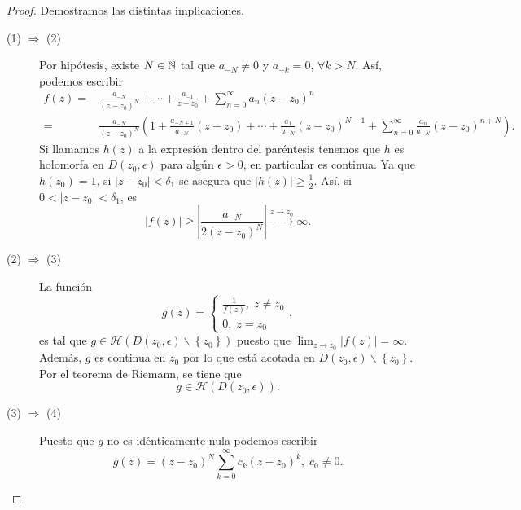 \begin{proof}
Demostramos las distintas implicaciones.
\begin{description}
\item[(1) $\displaystyle \Rightarrow $ (2)] Por hipótesis, existe $\displaystyle N \in \mathbb{N} $ tal que $\displaystyle a_{-N}\neq 0 $ y $\displaystyle a_{-k}=0 $, $\displaystyle \forall k > N $. Así, podemos escribir
	\[
	\begin{split}
		f\left(z\right)= & \frac{a_{-N}}{\left(z-z_{0}\right)^{N}}+ \cdots + \frac{a_{-1}}{z-z_{0}} + \sum^{\infty}_{n=0}a_{n}\left(z-z_{0}\right)^{n}\\
		= & \frac{a_{-N}}{\left(z-z_{0}\right)^{N}}\left(1 + \frac{a_{-N+1}}{a_{-N}}\left(z-z_{0}\right) + \cdots + \frac{a_{1}}{a_{-N}}\left(z-z_{0}\right)^{N-1}+\sum^{\infty}_{n = 0}\frac{a_{n}}{a_{-N}}\left(z-z_{0}\right)^{n + N}\right) .
	\end{split}
	\]
Si llamamos $\displaystyle h\left(z\right) $ a la expresión dentro del paréntesis tenemos que $\displaystyle h $ es holomorfa en $\displaystyle D\left(z_{0}, \epsilon \right) $ para algún $\displaystyle \epsilon > 0 $, en particular es continua. Ya que $\displaystyle h\left(z_{0}\right)=1 $, si $\displaystyle \left|z-z_{0}\right|< \delta_{1} $ se asegura que $\displaystyle \left|h\left(z\right)\right|\geq \frac{1}{2} $. 
Así, si $\displaystyle 0 < \left|z-z_{0}\right|<\delta_{1} $, es 
\[ \left|f\left(z\right)\right|\geq \left|\frac{a_{-N}}{2\left(z-z_{0}\right)^{N}}\right|\xrightarrow{z \to z_{0}}\infty .\]
\item[(2) $\displaystyle \Rightarrow $ (3)] La función 
	\[g\left(z\right)=
	\begin{cases}
	\frac{1}{f\left(z\right)}, \; z \neq z_{0} \\
	0, \; z = z_{0}
	\end{cases}
	,\]
	es tal que $\displaystyle g \in \mathcal{H}\left(D\left(z_{0}, \epsilon \right)\backslash \left\{ z_{0}\right\} \right) $ puesto que $\displaystyle \lim_{z \to z_{0}} \left|f\left(z\right)\right|=\infty  $. Además, $\displaystyle g $ es continua en $\displaystyle z_{0} $ por lo que está acotada en $\displaystyle D\left(z_{0}, \epsilon \right)\backslash \left\{ z_{0}\right\}  $. Por el teorema de Riemann, se tiene que 
	\[g\in \mathcal{H}\left(D\left(z_{0}, \epsilon \right)\right) .\]
\item[(3) $\displaystyle \Rightarrow $ (4)] Puesto que $\displaystyle g $ no es idénticamente nula podemos escribir
	\[g\left(z\right)=\left(z-z_{0}\right)^{N}\sum^{\infty}_{k = 0}c_{k}\left(z-z_{0}\right)^{k}, \; c_{0}\neq 0 .\]

\end{description}
\end{proof}
